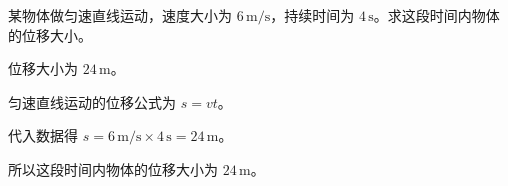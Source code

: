 
\begin{problem}
某物体做匀速直线运动，速度大小为 $6\,\mathrm{m/s}$，持续时间为 $4\,\mathrm{s}$。求这段时间内物体的位移大小。
\end{problem}

\begin{answer}
位移大小为 $24\,\mathrm{m}$。
\end{answer}

\begin{solutions}
匀速直线运动的位移公式为 $s=vt$。

代入数据得 $s=6\,\mathrm{m/s}\times 4\,\mathrm{s}=24\,\mathrm{m}$。

所以这段时间内物体的位移大小为 $24\,\mathrm{m}$。
\end{solutions}
